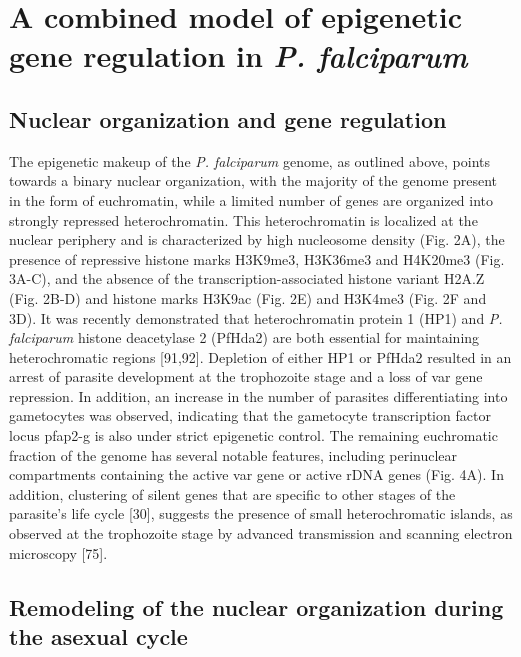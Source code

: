 \section{A combined model of epigenetic gene regulation in \textit{P.
falciparum}}

\subsection{Nuclear organization and gene regulation}

The epigenetic makeup of the \textit{P. falciparum} genome, as outlined above, points
towards a binary nuclear organization, with the majority of the genome present
in the form of euchromatin, while a limited number of genes are organized into
strongly repressed heterochromatin. This heterochromatin is localized at the
nuclear periphery and is characterized by high nucleosome density (Fig. 2A),
the presence of repressive histone marks H3K9me3, H3K36me3 and H4K20me3 (Fig.
3A-C), and the absence of the transcription-associated histone variant H2A.Z
(Fig. 2B-D) and histone marks H3K9ac (Fig. 2E) and H3K4me3 (Fig. 2F and 3D).
It was recently demonstrated that heterochromatin protein 1 (HP1) and \textit{P.
falciparum} histone deacetylase 2 (PfHda2) are both essential for maintaining
heterochromatic regions \citep{brancucci:heterochromatin, coleman:plasmodium}
[91,92]. Depletion of either HP1 or PfHda2 resulted in
an arrest of parasite development at the trophozoite stage and a loss of var
gene repression. In addition, an increase in the number of parasites
differentiating into gametocytes was observed, indicating that the gametocyte
transcription factor locus pfap2-g is also under strict epigenetic control.
The remaining euchromatic fraction of the genome has several notable features,
including perinuclear compartments containing the active var gene or active
rDNA genes (Fig. 4A). In addition, clustering of silent genes that are
specific to other stages of the parasite’s life cycle
\citep{ay:three-dimensional} [30], suggests the
presence of small heterochromatic islands, as observed at the trophozoite
stage by advanced transmission and scanning electron microscopy
\citep{weiner:3D} [75].

\subsection{Remodeling of the nuclear organization during the asexual cycle}

